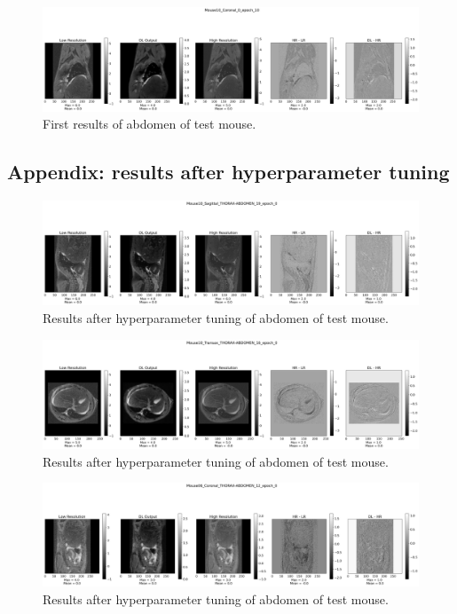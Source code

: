 \documentclass[twocolumn]{article}
\begin{document}
\begin{appendices}
\begin{figure}[h]
    \centering
    \includegraphics[width=1\linewidth]{Mouse10_Coronal_0_epoch_10.png}
    \caption{First results of abdomen of test mouse.}
\end{figure}

\newpage
\subsection{Appendix: results after hyperparameter tuning}
\label{Appendix: results after tuning}
\begin{figure}[h]
    \centering
    \includegraphics[width=1\linewidth]{Mouse10_Sagittal_THORAX-ABDOMEN_19_epoch_0.png}
    \caption{Results after hyperparameter tuning of abdomen of test mouse.}
    \label{mouse10_s_19}
\end{figure}

\begin{figure}[h]
    \centering
    \includegraphics[width=1\linewidth]{Mouse10_Transax_THORAX-ABDOMEN_16_epoch_0.png}
    \caption{Results after hyperparameter tuning of abdomen of test mouse.}
    \label{mouse10_t_16}
\end{figure}

\begin{figure}[h]
    \centering
    \includegraphics[width=1\linewidth]{Mouse06_Coronal_THORAX-ABDOMEN_12_epoch_0.png}
    \caption{Results after hyperparameter tuning of abdomen of test mouse.}
    \label{mouse06_c_12}
\end{figure}


\end{appendices}
\end{document}
